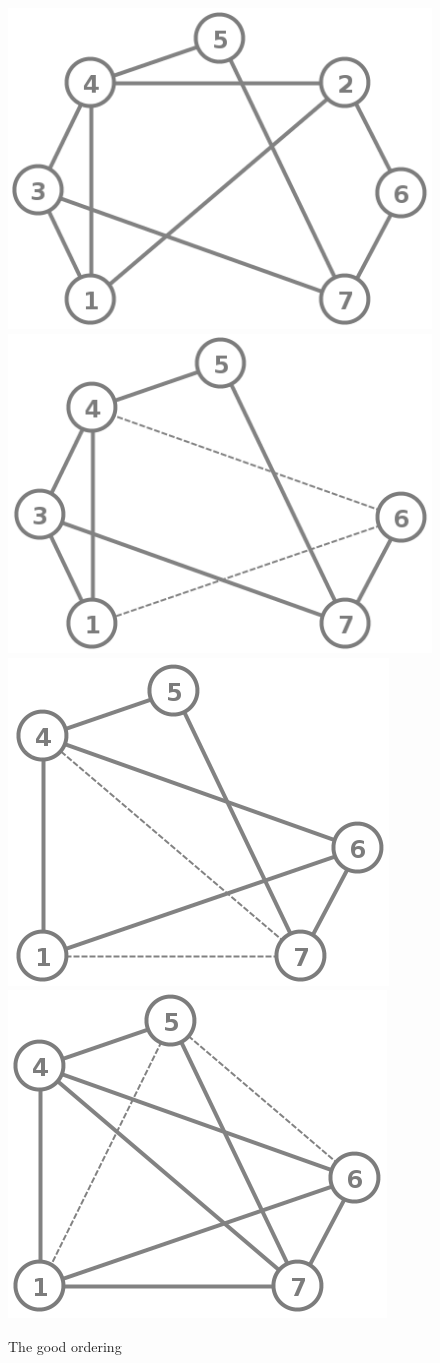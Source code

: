 \documentclass[12pt, oneside]{book}
\begin{document}
\begin{figure}
\centering
   \includegraphics[width=0.4\linewidth]{good_order}
   \hfill
   \includegraphics[width=0.4\linewidth]{good_order_2_removed}
   \includegraphics[width=0.4\linewidth]{good_order_3_2}
   \hfill
   \includegraphics[width=0.4\linewidth]{good_order_4_3_2}
\caption{The good  ordering}
\label{good_order_fillin}
\end{figure}
\end{document}

